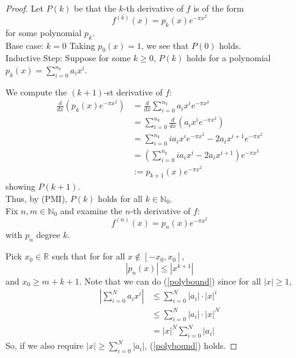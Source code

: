 \documentclass[12pt, reqno]{amsart}
\theoremstyle{definition}
\theoremstyle{remark}
\begin{document}
\begin{itemize}
\begin{itemize}
\begin{proof}
    
    Let $P(k)$ be that the $k$-th derivative of $f$ is of the form $$
f^{(k)}(x)=p_{k}(x)e^{-\pi x^{2}}
$$for some polynomial $p_{k}$. \\

Base case: $k=0$
Taking $p_{0}(x)=1$, we see that $P(0)$ holds. \\

Inductive Step: Suppose for some $k\ge0$, $P(k)$ holds for a polynomial $p_{k}(x)=\sum_{i=0}^{n_{k}}a_{i}x^{i}$. 

We compute the $(k+1)$-st derivative of $f$:
\begin{align*}
\frac{d}{dx}\left(p_{k}(x)e^{-\pi x^{2}}\right)&= \frac{d}{dx}\sum_{i=0}^{n_{k}}a_{i}x^{i}e^{-\pi x^{2}}\\
&= \sum_{i=0}^{n_{k}} \frac{d}{dx}\left(a_{i}x^{i}e^{-\pi x^{2}}\right)\\
&= \sum_{i=0}^{n_{k}}ia_{i}x^{i}e^{-\pi x^{2}}-2a_{i}x^{i+1}e^{-\pi x^{2}}\\
&= \left(\sum_{i=0}^{n_{k}}ia_{i}x^{i}-2a_{i}x^{i+1}\right)e^{-\pi x^{2}}\\
&:= p_{k+1}(x)e^{-\pi x^{2}}
\end{align*}
showing $P(k+1)$.\\

Thus, by (PMI), $P(k)$ holds for all $k\in \mathbb{N}_{0}$. 
\\


Fix $n,m\in \mathbb{N}_{0}$ and examine the $n$-th derivative of $f$: $$
f^{(n)}(x)=p_{n}(x)e^{-\pi x^{2}}
$$with $p_{n}$ degree $k$.

\vspace*{10 pt}

Pick $x_{0}\in \mathbb{R}$ such that for for all $x\notin[-x_{0},x_{0}]$, 
\begin{equation} \label{polybound}
    |p_{n}(x)|\le |x^{k+1}|
\end{equation}
and $x_{0}\ge m+k+1$. Note that we can do (\ref{polybound}) since for all $|x|\ge1$, 
\begin{align*}
\left|\sum_{i=0}^{N}a_{i}x^{i}\right|&\le \sum_{i=0}^{N}|a_{i}|\cdot|x|^{i}\\
&\le \sum_{i=0}^{N}|a_{i}|\cdot|x|^{N}\\
&= |x|^{N}\sum_{i=0}^{N}|a_{i}|
\end{align*}
So, if we also require $|x|\ge\sum_{i=0}^{N}|a_{i}|$, (\ref{polybound}) holds.


\end{proof}
\end{itemize}
\end{itemize}
\end{document}
